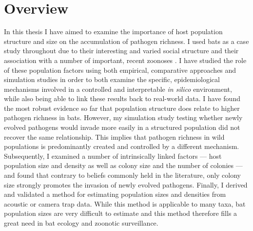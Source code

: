 


\section{Overview}

In this thesis I have aimed to examine the importance of host population structure and size on the accumulation of pathogen richness.
I used bats as a case study throughout due to their interesting and varied social structure \cite{kerth2008causes} and their association with a number of important, recent zoonoses \cite{leroy2005fruit, field2001natural, halpin2011pteropid, li2005bats}.
I have studied the role of these population factors using both empirical, comparative approaches and simulation studies in order to both examine the specific, epidemiological mechanisms involved in a controlled and interpretable \emph{in silico} environment, while also being able to link these results back to real-world data.
I have found the most robust evidence so far that population structure does relate to higher pathogen richness in bats.
However, my simulation study testing whether newly evolved pathogens would invade more easily in a structured population did not recover the same relationship. 
This implies that pathogen richness in wild populations is predominantly created and controlled by a different mechanism.
Subsequently, I examined a number of intrinsically linked factors --- host population size and density as well as colony size and the number of colonies --- and found that contrary to beliefs commonly held in the literature, only colony size strongly promotes the invasion of newly evolved pathogens.
Finally, I derived and validated a method for estimating population sizes and densities from acoustic or camera trap data.
While this method is applicable to many taxa, bat population sizes are very difficult to estimate and this method therefore fills a great need in bat ecology and zoonotic surveillance.

